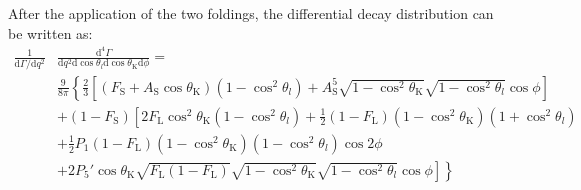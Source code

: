 

After the application of the two foldings, the differential decay distribution can be written as:
\begin{equation} \label{eq:PDF-f2}
  \begin{split}
    \frac{1}{\mathrm{d}\Gamma/\mathrm{d}q^2}&\frac{\mathrm{d}^4\Gamma}{\mathrm{d}q^2 \mathrm{d}\cos\theta_l \mathrm{d}\cos\theta_\mathrm{K} \mathrm{d}\phi} = \\
    &\frac{9}{8\pi}\left\{\frac{2}{3}\left[ (F_\mathrm{S}+A_\mathrm{S}\cos\theta_\mathrm{K})\left(1-\cos^2\theta_l\right) + A^5_\mathrm{S}\sqrt{1-\cos^2\theta_\mathrm{K}}\sqrt{1-\cos^2\theta_l}\cos\phi \right] \right.\\
    & + \left(1 - F_\mathrm{S}\right)\left[2F_\mathrm{L}\cos^2\theta_\mathrm{K}\left(1-\cos^2\theta_l\right)+\frac{1}{2}\left(1-F_\mathrm{L}\right)\left(1-\cos^2\theta_\mathrm{K}\right)\left(1+\cos^2\theta_l\right) \right.\\
      & + \frac{1}{2}P_1(1-F_\mathrm{L})(1-\cos^2\theta_\mathrm{K})(1-\cos^2\theta_l)\cos 2\phi \\
      & \left.\left. + 2P_5'\cos\theta_\mathrm{K}\sqrt{F_\mathrm{L}\left(1-F_\mathrm{L}\right)}\sqrt{1-\cos^2\theta_\mathrm{K}}\sqrt{1-\cos^2\theta_l}\cos\phi\right]\right\}
  \end{split}
\end{equation}

